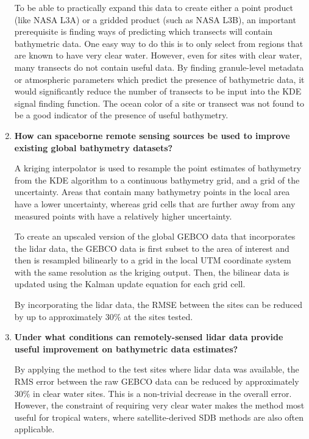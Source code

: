 \begin{enumerate}
    To be able to practically expand this data to create either a point product (like NASA L3A) or a gridded product (such as NASA L3B), an important prerequisite is finding ways of predicting which transects will contain bathymetric data. One easy way to do this is to only select from regions that are known to have very clear water. However, even for sites with clear water, many transects do not contain useful data. By finding granule-level metadata or atmospheric parameters which predict the presence of bathymetric data, it would significantly reduce the number of transects to be input into the KDE signal finding function. The ocean color of a site or transect was not found to be a good indicator of the presence of useful bathymetry.

    \item \textbf{How can spaceborne remote sensing sources be used to improve existing global bathymetry datasets?}
    
    A kriging interpolator is used to resample the point estimates of bathymetry from the KDE algorithm to a continuous bathymetry grid, and a grid of the uncertainty. Areas that contain many bathymetry points in the local area have a lower uncertainty, whereas grid cells that are further away from any measured points with have a relatively higher uncertainty.

    To create an upscaled version of the global GEBCO data that incorporates the lidar data, the GEBCO data is first subset to the area of interest and then is resampled bilinearly to a grid in the local UTM coordinate system with the same resolution as the kriging output. Then, the bilinear data is updated using the Kalman update equation for each grid cell. 

    By incorporating the lidar data, the RMSE between the sites can be reduced by up to approximately 30\% at the sites tested.
    
    \item \textbf{Under what conditions can remotely-sensed lidar data provide useful improvement on bathymetric data estimates?}
    
    By applying the method to the test sites where lidar data was available, the RMS error between the raw GEBCO data can be reduced by approximately 30\% in clear water sites. This is a non-trivial decrease in the overall error. However, the constraint of requiring very clear water makes the method most useful for tropical waters, where satellite-derived SDB methods are also often applicable. 




\end{enumerate}

